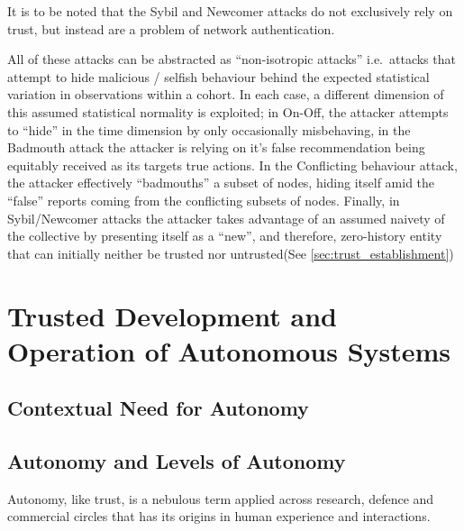 It is to be noted that the Sybil and Newcomer attacks do not exclusively rely on trust, but instead are a problem of network authentication.

All of these attacks can be abstracted as ``non-isotropic attacks'' i.e.\ attacks that attempt to hide malicious / selfish behaviour behind the expected statistical variation in observations within a cohort.
In each case, a different dimension of this assumed statistical normality is exploited; in On-Off, the attacker attempts to ``hide'' in the time dimension by only occasionally misbehaving, in the Badmouth attack the attacker is relying on it's false recommendation being equitably received as its targets true actions. 
In the Conflicting behaviour attack, the attacker effectively ``badmouths'' a subset of nodes, hiding itself amid the ``false'' reports coming from the conflicting subsets of nodes. 
Finally, in Sybil/Newcomer attacks the attacker takes advantage of an assumed naivety of the collective by presenting itself as a ``new'', and therefore, zero-history entity that can initially neither be trusted nor untrusted(See \autoref{sec:trust_establishment})

\pagebreak
\section{Trusted Development and Operation of Autonomous Systems}\label{sec:trust_autonomy}

\subsection{Contextual Need for Autonomy}

\subsection{Autonomy and Levels of Autonomy}

Autonomy, like trust, is a nebulous term applied across research, defence and commercial circles that has its origins in human experience and interactions. 

